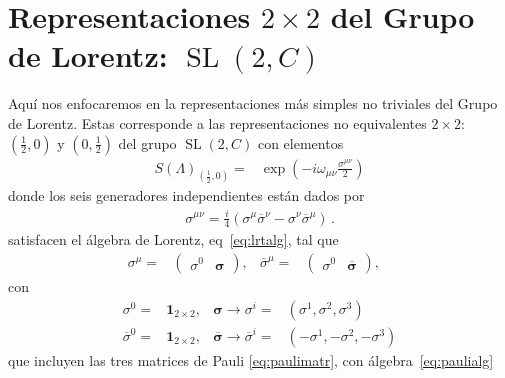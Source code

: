 \section{Representaciones $2\times 2$ del Grupo de Lorentz: $\operatorname{SL}(2,C)$}
\begin{frame}


Aquí nos enfocaremos en la representaciones más simples no triviales del Grupo de Lorentz. Estas corresponde a las representaciones no equivalentes $2\times2$: $(\frac{1}{2},0)$ y $(0,\frac{1}{2})$ del grupo $\operatorname{SL}(2,C)$ con elementos 
\begin{align}
  \label{eq:slamo}
  S(\Lambda)_{\left( \frac{1}{2},0 \right)}=&\exp\left(-i \omega_{\mu\nu}\frac{\sigma^{\mu\nu}}{2}\right)\nonumber
\end{align}
donde los seis generadores independientes están dados por
\begin{align}
  \sigma^{\mu \nu}=\frac{i}{4}\left(\sigma^{\mu} \overline{\sigma}^{\nu}-\sigma^{\nu} \overline{\sigma}^{\mu}\right)\,.
\end{align}
satisfacen el álgebra de Lorentz, eq~\eqref{eq:lrtalg}, tal que
\begin{align}
  \sigma^{\mu}=&\begin{pmatrix}
    \sigma^0 & \boldsymbol{\sigma}
\end{pmatrix}, & 
  \overline{\sigma}^{\mu}=&\begin{pmatrix}
    \sigma^0 & \overline{\boldsymbol{\sigma}}
\end{pmatrix}, & 
\end{align}
con
\begin{align}
  \sigma^0=&\mathbf{1}_{2\times2},& \boldsymbol{\sigma}\to \sigma^{i} =&(\sigma^1,\sigma^2,\sigma^3)\nonumber\\
  \overline{\sigma}^0=&\mathbf{1}_{2\times2},&\overline{\boldsymbol{\sigma}}\to \overline{\sigma}^{i} =&(-\sigma^1,-\sigma^2,-\sigma^3)
\end{align}
que incluyen las tres matrices de  Pauli \eqref{eq:paulimatr}, con álgebra~\eqref{eq:paulialg}
\end{frame}

